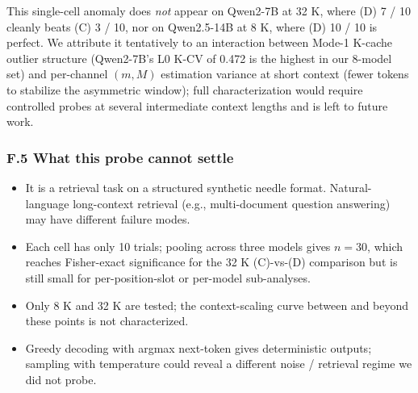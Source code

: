 This single-cell anomaly does \emph{not} appear on Qwen2-7B at 32 K,
where (D) 7 / 10 cleanly beats (C) 3 / 10, nor on Qwen2.5-14B at 8 K,
where (D) 10 / 10 is perfect. We attribute it tentatively to an
interaction between Mode-1 K-cache outlier structure (Qwen2-7B's L0 K-CV
of 0.472 is the highest in our 8-model set) and per-channel \((m, M)\)
estimation variance at short context (fewer tokens to stabilize the
asymmetric window); full characterization would require controlled
probes at several intermediate context lengths and is left to future
work.

\subsubsection{F.5 What this probe cannot
settle}\label{f.5-what-this-probe-cannot-settle}

\begin{itemize}
\tightlist
\item
  It is a retrieval task on a structured synthetic needle format.
  Natural-language long-context retrieval (e.g., multi-document question
  answering) may have different failure modes.
\item
  Each cell has only 10 trials; pooling across three models gives
  \(n = 30\), which reaches Fisher-exact significance for the 32 K
  (C)-vs-(D) comparison but is still small for per-position-slot or
  per-model sub-analyses.
\item
  Only 8 K and 32 K are tested; the context-scaling curve between and
  beyond these points is not characterized.
\item
  Greedy decoding with argmax next-token gives deterministic outputs;
  sampling with temperature could reveal a different noise / retrieval
  regime we did not probe.
\end{itemize}
